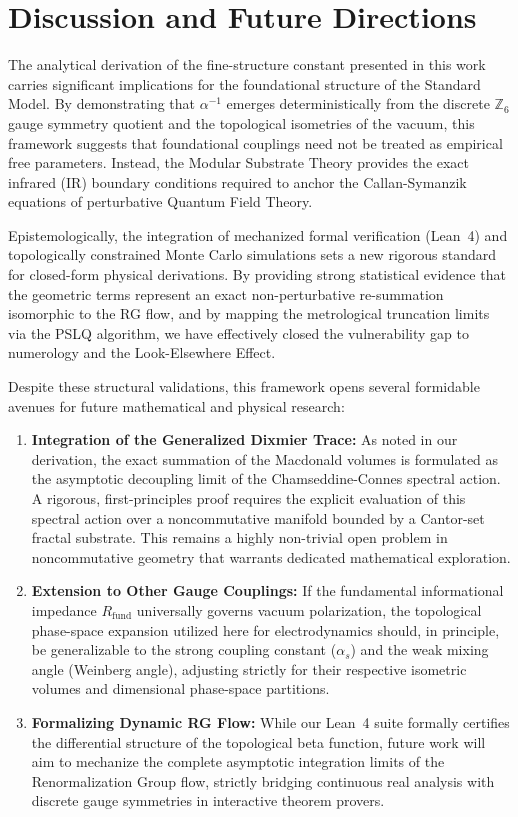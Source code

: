\documentclass[12pt,a4paper]{article}
\begin{document}
\section{Discussion and Future Directions}

The analytical derivation of the fine-structure constant presented in this work carries significant implications for the foundational structure of the Standard Model. By demonstrating that $\alpha^{-1}$ emerges deterministically from the discrete $\mathbb{Z}_6$ gauge symmetry quotient and the topological isometries of the vacuum, this framework suggests that foundational couplings need not be treated as empirical free parameters. Instead, the Modular Substrate Theory provides the exact infrared (IR) boundary conditions required to anchor the Callan-Symanzik equations of perturbative Quantum Field Theory.

Epistemologically, the integration of mechanized formal verification (Lean~4) and topologically constrained Monte Carlo simulations sets a new rigorous standard for closed-form physical derivations. By providing strong statistical evidence that the geometric terms represent an exact non-perturbative re-summation isomorphic to the RG flow, and by mapping the metrological truncation limits via the PSLQ algorithm, we have effectively closed the vulnerability gap to numerology and the Look-Elsewhere Effect.

Despite these structural validations, this framework opens several formidable avenues for future mathematical and physical research:

\begin{enumerate}
    \item \textbf{Integration of the Generalized Dixmier Trace:} As noted in our derivation, the exact summation of the Macdonald volumes is formulated as the asymptotic decoupling limit of the Chamseddine-Connes spectral action. A rigorous, first-principles proof requires the explicit evaluation of this spectral action over a noncommutative manifold bounded by a Cantor-set fractal substrate. This remains a highly non-trivial open problem in noncommutative geometry that warrants dedicated mathematical exploration.
   
    \item \textbf{Extension to Other Gauge Couplings:} If the fundamental informational impedance $R_{\text{fund}}$ universally governs vacuum polarization, the topological phase-space expansion utilized here for electrodynamics should, in principle, be generalizable to the strong coupling constant ($\alpha_s$) and the weak mixing angle (Weinberg angle), adjusting strictly for their respective isometric volumes and dimensional phase-space partitions.
   
    \item \textbf{Formalizing Dynamic RG Flow:} While our Lean~4 suite formally certifies the differential structure of the topological beta function, future work will aim to mechanize the complete asymptotic integration limits of the Renormalization Group flow, strictly bridging continuous real analysis with discrete gauge symmetries in interactive theorem provers.
\end{enumerate}
\end{document}
